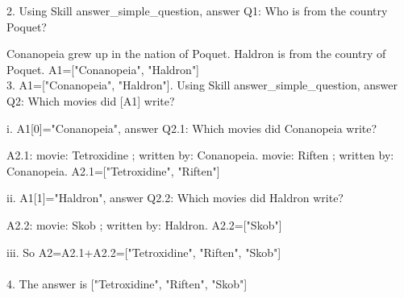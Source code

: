 \documentclass{article} \usepackage{arxiv}
\begin{document}
\begin{tcolorbox}[title = {CommaQA-E}, colback = Apricot!25!white, colframe = BrickRed!75!black]
\quad
   
2. Using Skill answer\_simple\_question, answer Q1: Who is from the country Poquet? 

Conanopeia grew up in the nation of Poquet. Haldron is from the country of Poquet. A1=["Conanopeia", "Haldron"] \\
3. A1=["Conanopeia", "Haldron"]. Using Skill answer\_simple\_question, answer Q2: Which movies did [A1] write? 

\quad

   \qquad  i. A1[0]="Conanopeia", answer Q2.1: Which movies did Conanopeia write? 

   \qquad \qquad  A2.1: movie: Tetroxidine ; written by: Conanopeia. movie: Riften ; written by: Conanopeia.   A2.1=["Tetroxidine", "Riften"] 
   
    \qquad ii. A1[1]="Haldron", answer Q2.2: Which movies did Haldron write? 
    
    \qquad \qquad  A2.2: movie: Skob ; written by: Haldron. A2.2=["Skob"] 
    
   \qquad  iii. So A2=A2.1+A2.2=["Tetroxidine", "Riften", "Skob"] \\ \\
4. The answer is ["Tetroxidine", "Riften", "Skob"] \\  
\end{tcolorbox}
\noindent\begin{minipage}{\textwidth}
 \label{Tab:example_compose_qa_skill}
\end{minipage}



\newpage
\end{document}
